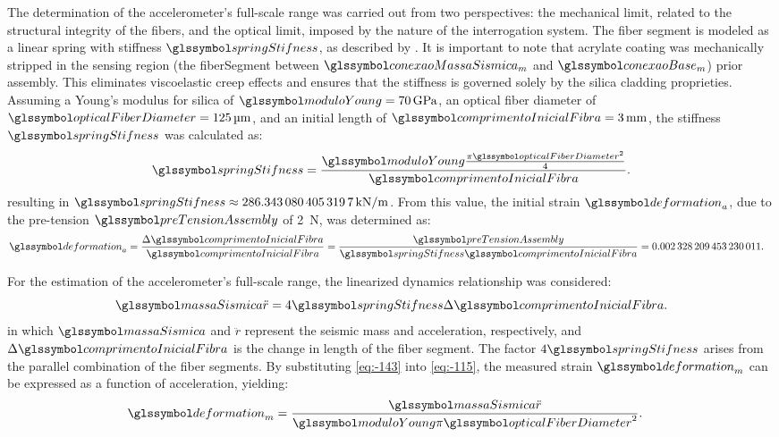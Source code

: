 \documentclass[sensors,article,accept,pdftex,moreauthors]{Definitions/mdpi}
\begin{document}
The determination of the accelerometer's full-scale range was carried out from two perspectives: the mechanical limit, related to the structural integrity of the fibers, and the optical limit, imposed by the nature of the interrogation system. The fiber segment is modeled as a linear spring with stiffness $\springStifness$, as described by \cite{Timoshenko1982}.
It is important to note that acrylate coating was mechanically stripped in the sensing region (the \gls{fiberSegment} between $\conexaoMassaSismica_{m}$ and $\conexaoBase_{m}$) prior assembly. This eliminates viscoelastic creep effects and ensures that the stiffness is governed solely by the silica cladding proprieties.
Assuming a Young's modulus for silica of $\moduloYoung=\SI{70}{\giga\pascal}$, an optical fiber diameter of $\opticalFiberDiameter=\SI{125}{\um}$, and an initial length of $\comprimentoInicialFibra=\SI{3}{\mm}$, the stiffness $\springStifness$ was calculated as:
\begin{equation}
	\springStifness=\frac{\moduloYoung\frac{\pi\opticalFiberDiameter^{2}}{4}}{\comprimentoInicialFibra}.
	\label{eq:-143}
\end{equation}
resulting in $\springStifness \approx \SI{286.3430804053197}{\kilo\newton\per\meter}$. From this value, the initial strain $\deformation_{a}$, due to the pre-tension $\preTensionAssembly$ of \SI{2}{\newton}, was determined as:
\begin{align}
	\deformation_{a}=\frac{\Delta\comprimentoInicialFibra}{\comprimentoInicialFibra} & =\frac{\preTensionAssembly}{\springStifness\comprimentoInicialFibra}=\num[round-precision=4]{0.002328209453230011}.
	\label{eq:-180}
\end{align}

For the estimation of the accelerometer's full-scale range, the linearized dynamics relationship was considered:
\begin{equation}
	\massaSismica\ddot{r}=4\springStifness\Delta\comprimentoInicialFibra.
	\label{eq:-115}
\end{equation}
in which $\massaSismica$ and $\ddot{r}$ represent the seismic mass and acceleration, respectively, and $\Delta\comprimentoInicialFibra$ is the change in length of the fiber segment. The factor $4\springStifness$ arises from the parallel combination of the fiber segments. By substituting \cref{eq:-143} into \cref{eq:-115}, the measured strain $\deformation_{m}$ can be expressed as a function of acceleration, yielding:
\begin{align}
	\deformation_{m} & =\frac{\massaSismica\ddot{r}}{\moduloYoung\pi\opticalFiberDiameter^{2}}.
	\label{eq:-178}
\end{align}
\end{document}
